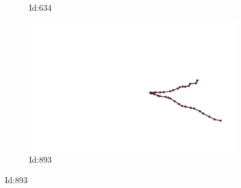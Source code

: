 \documentclass[12pt,twoside]{report}
\begin{document}
\begin{figure}
\begin{subfigure}[b]{0.20\textwidth}
\caption{Id:634}
\end{subfigure}
\begin{subfigure}[b]{0.20\textwidth}
\centering
\includegraphics[width=\textwidth]{../../trajectories/893.png}
\caption{Id:893}
\end{subfigure}
\end{figure}
\end{document}
